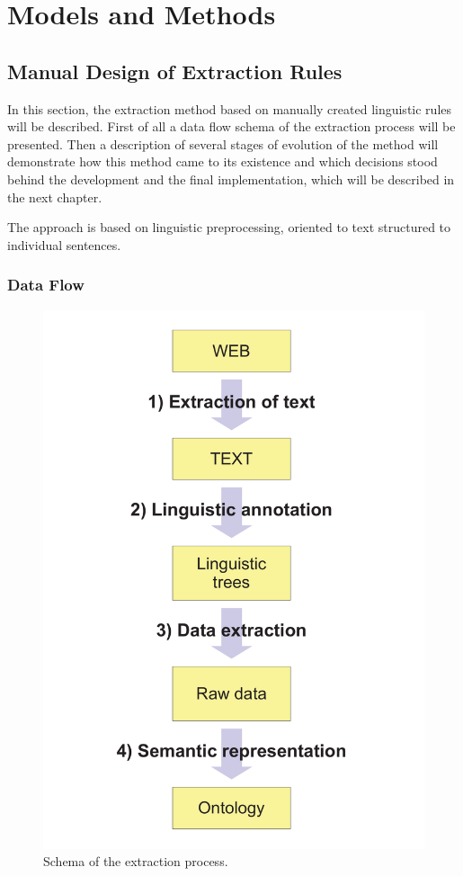 \chapter{Models and Methods} \label{sec:ch_methods}

\section{Manual Design of Extraction Rules} \label{sec:methods_manual}
\graphicspath{{../img/ch50/}}

In this section, the extraction method based on manually created linguistic rules will be described. First of all a data flow schema of the extraction process will be presented. Then a description of several stages of evolution of the method will demonstrate how this method came to its existence and which decisions stood behind the development and the final implementation, which will be described in the next chapter.

The approach is based on linguistic preprocessing, oriented to text structured to individual sentences. 



\subsection{Data Flow} \label{sec:ch50_data_flow}

\begin{figure}
	\centering
		\includegraphics[width=0.2\hsize]{ap_schema}
	\caption{Schema of the extraction process.}
	\label{fig:ch50_ap_schema}
\end{figure}


